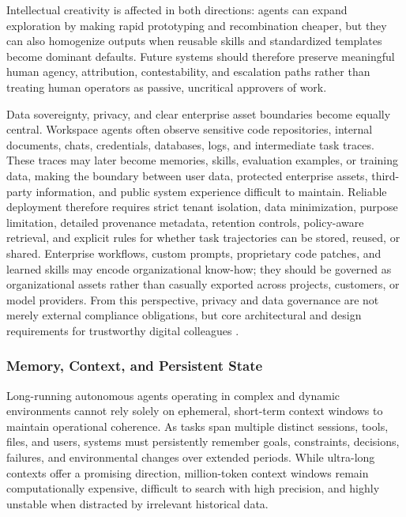 Intellectual creativity is affected in both directions: agents can expand exploration by making rapid prototyping and recombination cheaper, but they can also homogenize outputs when reusable skills and standardized templates become dominant defaults. Future systems should therefore preserve meaningful human agency, attribution, contestability, and escalation paths rather than treating human operators as passive, uncritical approvers of work.

Data sovereignty, privacy, and clear enterprise asset boundaries become equally central. Workspace agents often observe sensitive code repositories, internal documents, chats, credentials, databases, logs, and intermediate task traces. These traces may later become memories, skills, evaluation examples, or training data, making the boundary between user data, protected enterprise assets, third-party information, and public system experience difficult to maintain. Reliable deployment therefore requires strict tenant isolation, data minimization, purpose limitation, detailed provenance metadata, retention controls, policy-aware retrieval, and explicit rules for whether task trajectories can be stored, reused, or shared. Enterprise workflows, custom prompts, proprietary code patches, and learned skills may encode organizational know-how; they should be governed as organizational assets rather than casually exported across projects, customers, or model providers. From this perspective, privacy and data governance are not merely external compliance obligations, but core architectural and design requirements for trustworthy digital colleagues \citep{li2026prism,zhao2026clawguard,gruber2026agenticforensics}.

\subsubsection{Memory, Context, and Persistent State}

Long-running autonomous agents operating in complex and dynamic environments cannot rely solely on ephemeral, short-term context windows to maintain operational coherence. As tasks span multiple distinct sessions, tools, files, and users, systems must persistently remember goals, constraints, decisions, failures, and environmental changes over extended periods. While ultra-long contexts offer a promising direction, million-token context windows remain computationally expensive, difficult to search with high precision, and highly unstable when distracted by irrelevant historical data.


